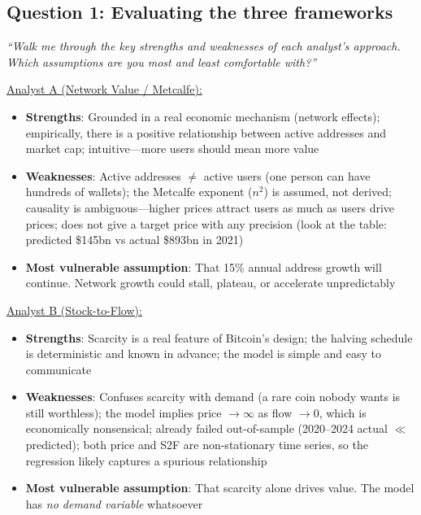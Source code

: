 \documentclass[11pt]{article}
\begin{document}
\subsection*{Question 1: Evaluating the three frameworks}

\textit{``Walk me through the key strengths and weaknesses of each analyst's approach. Which assumptions are you most and least comfortable with?''}

\medskip
\noindent\underline{Analyst A (Network Value / Metcalfe):}
\begin{itemize}[leftmargin=*]
\item \textbf{Strengths}: Grounded in a real economic mechanism (network effects); empirically, there is a positive relationship between active addresses and market cap; intuitive---more users should mean more value
\item \textbf{Weaknesses}: Active addresses $\neq$ active users (one person can have hundreds of wallets); the Metcalfe exponent ($n^2$) is assumed, not derived; causality is ambiguous---higher prices attract users as much as users drive prices; does not give a target price with any precision (look at the table: predicted \$145bn vs actual \$893bn in 2021)
\item \textbf{Most vulnerable assumption}: That 15\% annual address growth will continue. Network growth could stall, plateau, or accelerate unpredictably
\end{itemize}

\medskip
\noindent\underline{Analyst B (Stock-to-Flow):}
\begin{itemize}[leftmargin=*]
\item \textbf{Strengths}: Scarcity is a real feature of Bitcoin's design; the halving schedule is deterministic and known in advance; the model is simple and easy to communicate
\item \textbf{Weaknesses}: Confuses scarcity with demand (a rare coin nobody wants is still worthless); the model implies price $\to \infty$ as flow $\to 0$, which is economically nonsensical; already failed out-of-sample (2020--2024 actual $\ll$ predicted); both price and S2F are non-stationary time series, so the regression likely captures a spurious relationship
\item \textbf{Most vulnerable assumption}: That scarcity alone drives value. The model has \textit{no demand variable} whatsoever
\end{itemize}
\end{document}
